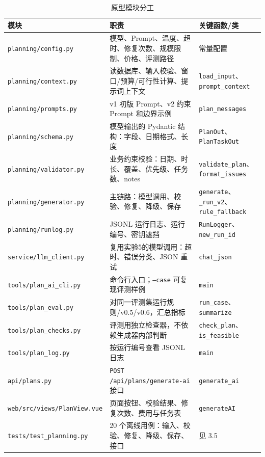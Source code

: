 \documentclass[UTF8,12pt,a4paper]{ctexart}
\begin{document}
\begin{table}[H]
\centering
\caption{原型模块分工}
\label{tab:modules}
\scriptsize
\begin{tabularx}{\textwidth}{L{3.6cm}X L{3.2cm}}
\toprule
模块 & 职责 & 关键函数/类 \\
\midrule
\texttt{planning/config.py} & 模型、Prompt、温度、超时、修复次数、规模限制、价格、评测路径 & 常量配置 \\
\texttt{planning/context.py} & 读数据库、输入校验、窗口/预算/可行性计算、提示词上下文 & \texttt{load\_input}、\texttt{prompt\_context} \\
\texttt{planning/prompts.py} & v1 初版 Prompt、v2 约束 Prompt 和边界示例 & \texttt{plan\_messages} \\
\texttt{planning/schema.py} & 模型输出的 Pydantic 结构：字段、日期格式、长度 & \texttt{PlanOut}、\texttt{PlanTaskOut} \\
\texttt{planning/validator.py} & 业务约束校验：日期、时长、覆盖、优先级、任务数、notes & \texttt{validate\_plan}、\texttt{format\_issues} \\
\texttt{planning/generator.py} & 主链路：模型调用、校验、修复、降级、保存 & \texttt{generate}、\texttt{\_run\_v2}、\texttt{rule\_fallback} \\
\texttt{planning/runlog.py} & JSONL 运行日志、运行编号、密钥遮挡 & \texttt{RunLogger}、\texttt{new\_run\_id} \\
\texttt{service/llm\_client.py} & 复用实验5的模型调用：超时、错误分类、JSON 重试 & \texttt{chat\_json} \\
\texttt{tools/plan\_ai\_cli.py} & 命令行入口；\texttt{--case} 可复现评测样例 & \texttt{main} \\
\texttt{tools/plan\_eval.py} & 对同一评测集运行规则/v0.5/v0.6，汇总指标 & \texttt{run\_case}、\texttt{summarize} \\
\texttt{tools/plan\_checks.py} & 评测用独立检查器，不依赖生成器内部判断 & \texttt{check\_plan}、\texttt{is\_feasible} \\
\texttt{tools/plan\_log.py} & 按运行编号查看 JSONL 日志 & \texttt{main} \\
\texttt{api/plans.py} & \texttt{POST /api/plans/generate-ai} 接口 & \texttt{generate\_ai} \\
\texttt{web/src/views/PlanView.vue} & 页面按钮、校验结果、修复次数、费用与任务表 & \texttt{generateAI} \\
\texttt{tests/test\_planning.py} & 20 个离线用例：输入、校验、修复、降级、保存、接口 & 见 3.5 \\
\bottomrule
\end{tabularx}
\end{table}
\end{document}

